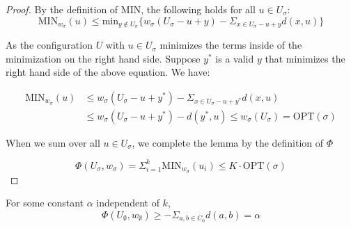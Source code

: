\begin{proof}
     By the definition of $\mathrm{MIN}$, the following holds for all $u \in U_\sigma$:
     \begin{equation*}
        \mathrm{MIN}_{w_\sigma}(u) \leq \mathrm{min}_{y \not \in U_\sigma} \{ w_\sigma(U_\sigma - u + y) - \Sigma_{x \in U_\sigma - u + y} d(x, u)\}
     \end{equation*}

     As the configuration $U$ with $u \in U_\sigma$ minimizes the terms inside of the minimization on the right hand side. Suppose $y^*$ is a valid $y$ that minimizes the right hand side of the above equation. We have:
     
     \begin{equation*}
        \begin{split}
            \mathrm{MIN}_{w_\sigma}(u) &\leq w_\sigma(U_\sigma - u + y^*) - \Sigma_{x \in U_\sigma - u + y^*} d(x, u) \\
            &\leq w_\sigma(U_\sigma - u + y^*) - d(y^*, u) \leq w_\sigma(U_\sigma) = \mathrm{OPT}(\sigma)
        \end{split}
     \end{equation*}

     When we sum over all $u \in U_\sigma$, we complete the lemma by the definition of $\Phi$
     
     \begin{equation*}
        \Phi(U_\sigma, w_\sigma) = \Sigma_{i=1}^k \mathrm{MIN}_{w_\sigma}(u_i) \leq K \cdot  \mathrm{OPT}(\sigma)
     \end{equation*}
\end{proof}

\begin{lemma}
    \label{lem:er2}
    For some constant $\alpha$ independent of $k$,
    \begin{equation*}
        \Phi(U_\emptyset, w_\emptyset) \geq - \Sigma_{a, b \in C_0} d(a, b) = \alpha
    \end{equation*}
\end{lemma}


